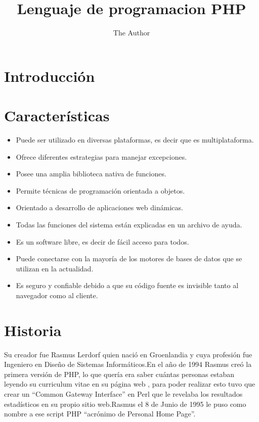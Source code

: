 \documentclass[11pt]{article} %
\title{Lenguaje de programacion PHP}
\author{The Author}
\begin{document}
\maketitle

\section{Introducción}


\section{Características}

\begin {itemize}

\item	Puede ser utilizado  en diversas plataformas, es decir que es multiplataforma.

\item	Ofrece diferentes estrategias para manejar excepciones.

\item	Posee una amplia biblioteca nativa de funciones.

\item	Permite técnicas de programación orientada a objetos.

\item	Orientado a desarrollo de aplicaciones web dinámicas.

\item	Todas las funciones del sistema están explicadas en un  archivo de ayuda.

\item	Es un software libre, es decir de fácil acceso para todos.

\item	Puede conectarse con la mayoría de los motores de bases de datos que se utilizan en la actualidad.

\item	Es seguro y confiable debido a que su código fuente es invisible tanto al navegador como al cliente.

\end {itemize}

\section{Historia}

Su creador fue  Rasmus  Lerdorf  quien nació en  Groenlandia  y cuya  profesión fue Ingeniero en Diseño de Sistemas Informáticos.En el año de 1994 Rasmus creó la primera versión de PHP, lo que quería era saber cuántas personas estaban leyendo su curriculum vitae en 
su página web , para poder realizar esto tuvo que crear  un   “Common Gateway Interface” en  Perl  que le revelaba  los resultados estadísticos en su propio sitio web.Rasmus el 8 de Junio de 1995 le puso como nombre a ese script PHP  “acrónimo de Personal Home Page”.
\end{document}
